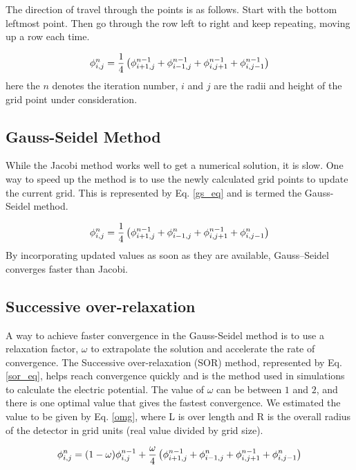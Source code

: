 The direction of travel through the points is as follows. Start with the bottom leftmost point. Then go through the row left to right and keep repeating, moving up a row each time.


\begin{equation}{\label{jacobi}}
 \phi_{i,j}^{n} = \frac{1}{4}  \left(\phi^{n-1}_{i+1,j} + \phi^{n-1}_{i-1,j} + \phi^{n-1}_{i,j+1} + \phi^{n-1}_{i,j-1} \right)
\end{equation}
here the $n$ denotes the iteration number, $i$ and $j$ are the radii and height of the grid point under consideration. 

\subsection{Gauss-Seidel Method}

While the Jacobi method works well to get a numerical solution, it is slow. One way to speed up the method is to use the newly calculated grid points to update the current grid. This is represented by Eq. \ref{gs_eq} and is termed the Gauss-Seidel method.


\begin{equation}{\label{gs_eq}}
 \phi_{i,j}^{n} = \frac{1}{4}  \left(\phi^{n-1}_{i+1,j} + \phi^n_{i-1,j} + \phi^{n-1}_{i,j+1} + \phi^n_{i,j-1} \right)
\end{equation}
By incorporating updated values as soon as they are available, Gauss--Seidel converges faster than Jacobi.

\subsection{Successive over-relaxation}

A way to achieve faster convergence in the Gauss-Seidel method is to use a relaxation factor, $\omega$ to extrapolate the solution and accelerate the rate of convergence. The Successive over-relaxation (SOR) method, represented by Eq. \ref{sor_eq}, helps reach convergence quickly and is the method used in {\siggen} simulations to calculate the electric potential. The value of $\omega$ can be between $1$ and $2$, and there is one optimal value that gives the fastest convergence. We estimated the value to be given by Eq. \ref{omg}, where L is over length and R is the overall radius of the detector in grid units (real value divided by grid size). 

\begin{equation}{\label{sor_eq}}
 \phi_{i,j}^{n} = (1-\omega)\phi^{n-1}_{i,j} + \frac{\omega}{4} \left(\phi^{n-1}_{i+1,j} + \phi^n_{i-1,j} + \phi^{n-1}_{i,j+1} + \phi^n_{i,j-1} \right)
\end{equation}

